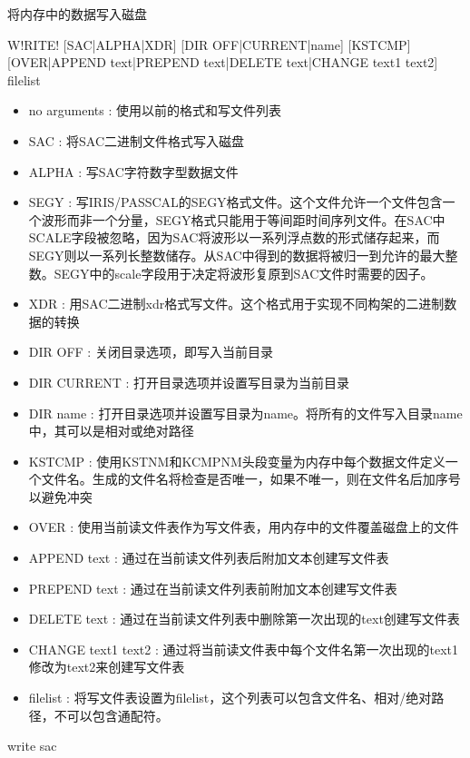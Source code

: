 \label{cmd:write}

将内存中的数据写入磁盘

\begin{SACSTX}
W!RITE! [SAC|ALPHA|XDR] [DIR OFF|CURRENT|name] [KSTCMP] 
    [OVER|APPEND text|PREPEND text|DELETE text|CHANGE text1 text2] filelist
\end{SACSTX}

\begin{itemize}
\item no arguments : 使用以前的格式和写文件列表 
\item SAC : 将SAC二进制文件格式写入磁盘 
\item ALPHA : 写SAC字符数字型数据文件 
\item SEGY : 写IRIS/PASSCAL的SEGY格式文件。这个文件允许一个文件包含一个波形而非一个分量，SEGY格式只能用于等间距时间序列文件。在SAC中SCALE字段被忽略，因为SAC将波形以一系列浮点数的形式储存起来，而SEGY则以一系列长整数储存。从SAC中得到的数据将被归一到允许的最大整数。SEGY中的scale字段用于决定将波形复原到SAC文件时需要的因子。
\item XDR : 用SAC二进制xdr格式写文件。这个格式用于实现不同构架的二进制数据的转换 
\item DIR OFF : 关闭目录选项，即写入当前目录 
\item DIR CURRENT : 打开目录选项并设置写目录为当前目录 
\item DIR name : 打开目录选项并设置写目录为name。将所有的文件写入目录name中，其可以是相对或绝对路径 
\item KSTCMP : 使用KSTNM和KCMPNM头段变量为内存中每个数据文件定义一个文件名。生成的文件名将检查是否唯一，如果不唯一，则在文件名后加序号以避免冲突
\item OVER : 使用当前读文件表作为写文件表，用内存中的文件覆盖磁盘上的文件 
\item APPEND text : 通过在当前读文件列表后附加文本创建写文件表 
\item PREPEND text : 通过在当前读文件列表前附加文本创建写文件表 
\item DELETE text :  通过在当前读文件列表中删除第一次出现的text创建写文件表 
\item CHANGE text1 text2 : 通过将当前读文件表中每个文件名第一次出现的text1修改为text2来创建写文件表 
\item filelist : 将写文件表设置为filelist，这个列表可以包含文件名、相对/绝对路径，不可以包含通配符。 
\end{itemize}

\begin{SACDFT}
write sac
\end{SACDFT}

